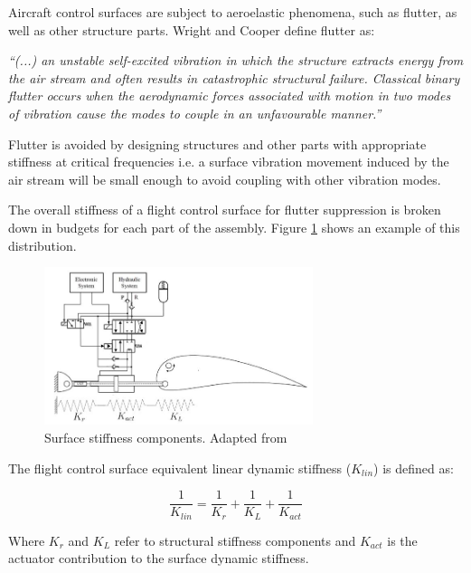 Aircraft control surfaces are subject to aeroelastic phenomena, such as flutter, as well as other structure parts. Wright and Cooper \citeyear{Wright} define flutter as:

\begin{center}
	\textit{``(...) an unstable self-excited vibration in which the structure extracts energy from the air stream and often results in catastrophic structural failure. Classical binary flutter occurs when the aerodynamic forces associated with motion in two modes of vibration cause the modes to couple in an unfavourable manner.''}
\end{center}  

Flutter	is avoided by designing structures and other parts with appropriate stiffness at critical frequencies i.e. a surface vibration movement induced by the air stream will be small enough to avoid coupling with other vibration modes. 

The overall stiffness of a flight control surface for flutter suppression is broken down in budgets for each part of the assembly. Figure \ref{fig:2_1_DynStiff} shows an example of this distribution.

\begin{figure}[H]
	\centering
	\centerline{\includegraphics[width=0.7\textwidth]{Figuras/2.TheoryBackground/2-FlutterDynamicStiff.jpg}}
	\caption{Surface stiffness components. Adapted from }
	\label{fig:2_1_DynStiff}
\end{figure}

The flight control surface equivalent linear dynamic stiffness ($K_{lin}$) is defined as:

\begin{equation}
\frac{1}{K_{lin}} = \frac{1}{K_r} + \frac{1}{K_L} + \frac{1}{K_{act}}
\label{eq:klin}
\end{equation}

Where $K_r$ and $K_L$ refer to structural stiffness components and $K_{act}$ is the actuator contribution to the surface dynamic stiffness.

